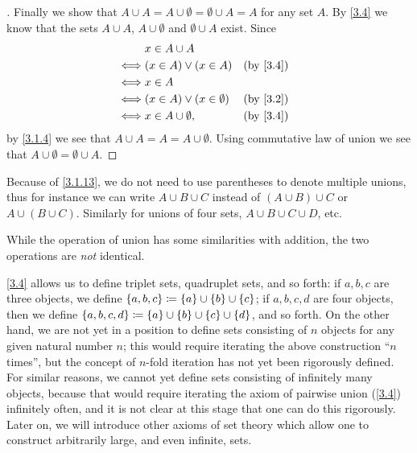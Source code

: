 \begin{proof}[]
  Finally we show that \(A \cup A = A \cup \emptyset = \emptyset \cup A = A\) for any set \(A\).
  By \cref{3.4} we know that the sets \(A \cup A\), \(A \cup \emptyset\) and \(\emptyset \cup A\) exist.
  Since
  \begin{align*}
         & x \in A \cup A                                 \\
    \iff & (x \in A) \lor (x \in A)         &  & \by{3.4} \\
    \iff & x \in A                                        \\
    \iff & (x \in A) \lor (x \in \emptyset) &  & \by{3.2} \\
    \iff & x \in A \cup \emptyset,          &  & \by{3.4}
  \end{align*}
  by \cref{3.1.4} we see that \(A \cup A = A = A \cup \emptyset\).
  Using commutative law of union we see that \(A \cup \emptyset = \emptyset \cup A\).
\end{proof}

\begin{note}
  Because of \cref{3.1.13}, we do not need to use parentheses to denote multiple unions, thus for instance we can write \(A \cup B \cup C\) instead of \((A \cup B) \cup C\) or \(A \cup (B \cup C)\).
  Similarly for unions of four sets, \(A \cup B \cup C \cup D\), etc.
\end{note}

\begin{rmk}\label{3.1.14}
  While the operation of union has some similarities with addition, the two operations are \emph{not} identical.
\end{rmk}

\begin{note}
  \cref{3.4} allows us to define triplet sets, quadruplet sets, and so forth: if \(a, b, c\) are three objects, we define \(\left\lbrace a, b, c\right\rbrace \coloneqq \left\lbrace a\right\rbrace \cup \left\lbrace b\right\rbrace \cup \left\lbrace c\right\rbrace\);
  if \(a, b, c, d\) are four objects, then we define \(\left\lbrace a, b, c, d\right\rbrace \coloneqq \left\lbrace a\right\rbrace \cup \left\lbrace b\right\rbrace \cup \left\lbrace c\right\rbrace \cup \left\lbrace d\right\rbrace\), and so forth.
  On the other hand, we are not yet in a position to define sets consisting of \(n\) objects for any given natural number \(n\);
  this would require iterating the above construction ``\(n\) times'', but the concept of \(n\)-fold iteration has not yet been rigorously defined.
  For similar reasons, we cannot yet define sets consisting of infinitely many objects, because that would require iterating the axiom of pairwise union (\cref{3.4}) infinitely often, and it is not clear at this stage that one can do this rigorously.
  Later on, we will introduce other axioms of set theory which allow one to construct arbitrarily large, and even infinite, sets.
\end{note}

